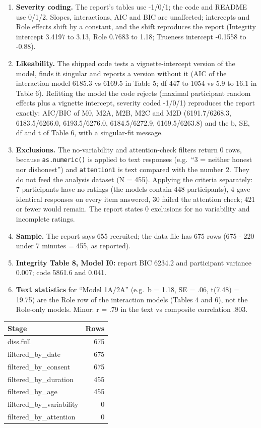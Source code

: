 \documentclass[
]{article}
\newcounter{none} %
\providecommand{\tightlist}{%
  \setlength{\itemsep}{0pt}\setlength{\parskip}{0pt}}
\begin{document}
\begin{enumerate}
\def\labelenumi{\arabic{enumi}.}
\tightlist
\item
  \textbf{Severity coding.} The report's tables use -1/0/1; the code and
  README use 0/1/2. Slopes, interactions, AIC and BIC are unaffected;
  intercepts and Role effects shift by a constant, and the shift
  reproduces the report (Integrity intercept 3.4197 to 3.13, Role 0.7683
  to 1.18; Trueness intercept -0.1558 to -0.88).
\item
  \textbf{Likeability.} The shipped code tests a vignette-intercept
  version of the model, finds it singular and reports a version without
  it (AIC of the interaction model 6185.3 vs 6169.5 in Table 5; df 447
  to 1054 vs 5.9 to 16.1 in Table 6). Refitting the model the code
  rejects (maximal participant random effects plus a vignette intercept,
  severity coded -1/0/1) reproduces the report exactly: AIC/BIC of M0,
  M2A, M2B, M2C and M2D (6191.7/6268.3, 6183.5/6266.0, 6193.5/6276.0,
  6184.5/6272.9, 6169.5/6263.8) and the b, SE, df and t of Table 6, with
  a singular-fit message.
\item
  \textbf{Exclusions.} The no-variability and attention-check filters
  return 0 rows, because \texttt{as.numeric()} is applied to text
  responses (e.g.~``3 = neither honest nor dishonest'') and
  \texttt{attention1} is text compared with the number 2. They do not
  feed the analysis dataset (N = 455). Applying the criteria separately:
  7 participants have no ratings (the models contain 448 participants),
  4 gave identical responses on every item answered, 30 failed the
  attention check; 421 or fewer would remain. The report states 0
  exclusions for no variability and incomplete ratings.
\item
  \textbf{Sample.} The report says 655 recruited; the data file has 675
  rows (675 - 220 under 7 minutes = 455, as reported).
\item
  \textbf{Integrity Table 8, Model I0:} report BIC 6234.2 and
  participant variance 0.007; code 5861.6 and 0.041.
\item
  \textbf{Text statistics} for ``Model 1A/2A'' (e.g.~b = 1.18, SE = .06,
  t(7.48) = 19.75) are the Role row of the interaction models (Tables 4
  and 6), not the Role-only models. Minor: r = .79 in the text vs
  composite correlation .803.
\end{enumerate}

{\def\LTcaptype{none} %
\begin{longtable}[]{@{}lr@{}}
\toprule\noalign{}
Stage & Rows \\
\midrule\noalign{}
\endhead
\bottomrule\noalign{}
\endlastfoot
diss.full & 675 \\
filtered\_by\_date & 675 \\
filtered\_by\_consent & 675 \\
filtered\_by\_duration & 455 \\
filtered\_by\_age & 455 \\
filtered\_by\_variability & 0 \\
filtered\_by\_attention & 0 \\
\end{longtable}
}
\end{document}
